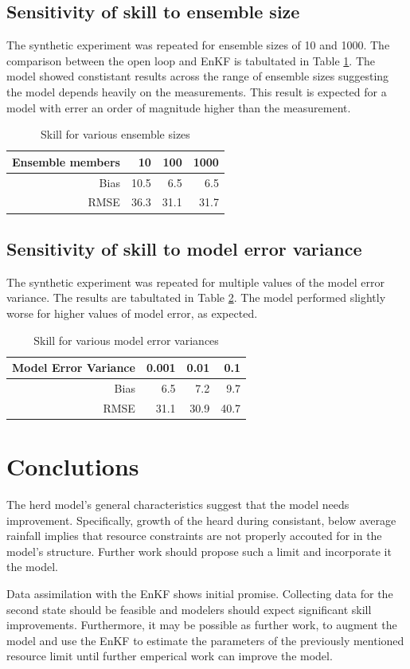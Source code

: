 \documentclass[fleqn, letterpaper]{article}
\numberwithin{figure}{section}
\begin{document}
\subsection{Sensitivity of skill to ensemble size}
The synthetic experiment was repeated for ensemble sizes of 10 and 1000. The comparison between the open loop and EnKF is tabultated in Table \ref{ensize}. The model showed constistant results across the range of ensemble sizes suggesting the model depends heavily on the measurements. This result is expected for a model with errer an order of magnitude higher than the measurement.
\begin{table}
\begin{tabular}{rrrr}
Ensemble members & 10 & 100 & 1000 \\
\hline
Bias & 10.5 & 6.5 & 6.5 \\
RMSE & 36.3 & 31.1 & 31.7
\end{tabular}
\label{ensize}
\caption{Skill for various ensemble sizes}
\end{table}

\subsection{Sensitivity of skill to model error variance}
The synthetic experiment was repeated for multiple values of the model error variance. The results are tabultated in Table \ref{error}. The model performed slightly worse for higher values of model error, as expected.
\begin{table}
\begin{tabular}{rrrr}
Model Error Variance & 0.001 & 0.01 & 0.1 \\
\hline
Bias & 6.5 & 7.2 & 9.7\\
RMSE & 31.1 & 30.9 & 40.7
\end{tabular}
\caption{Skill for various model error variances}
\label{error}
\end{table}

\section{Conclutions}
The herd model's general characteristics suggest that the model needs improvement.
Specifically, growth of the heard during consistant, below average rainfall implies that resource constraints are not properly accouted for in the model's structure.
Further work should propose such a limit and incorporate it the model.

Data assimilation with the EnKF shows initial promise. Collecting data for the second state should be feasible and modelers should expect significant skill improvements. Furthermore, it may be possible as further work, to augment the model and use the EnKF to estimate the parameters of the previously mentioned resource limit until further emperical work can improve the model.




\end{document}
